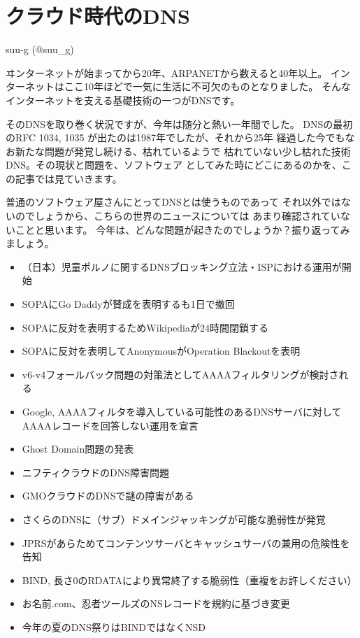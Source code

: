 
\cleardoublepage
\plainifnotempty

\chapter{クラウド時代のDNS}
\begin{flushright}
suu-g (@suu\_g)
\end{flushright}

\lettrine{ヰ}
ンターネットが始まってから20年、ARPANETから数えると40年以上。
インターネットはここ10年ほどで一気に生活に不可欠のものとなりました。
そんなインターネットを支える基礎技術の一つがDNSです。

そのDNSを取り巻く状況ですが、今年は随分と熱い一年間でした。
DNSの最初のRFC 1034, 1035 が出たのは1987年でしたが、それから25年
経過した今でもなお新たな問題が発覚し続ける、枯れているようで
枯れていない少し枯れた技術DNS。その現状と問題を、ソフトウェア
としてみた時にどこにあるのかを、この記事では見ていきます。

普通のソフトウェア屋さんにとってDNSとは使うものであって
それ以外ではないのでしょうから、こちらの世界のニュースについては
あまり確認されていないことと思います。
今年は、どんな問題が起きたのでしょうか？振り返ってみましょう。
\begin{itemize}
  \item （日本）児童ポルノに関するDNSブロッキング立法・ISPにおける運用が開始
  \item SOPAにGo Daddyが賛成を表明するも1日で撤回
  \item SOPAに反対を表明するためWikipediaが24時間閉鎖する
  \item SOPAに反対を表明してAnonymousがOperation Blackoutを表明
  \item v6-v4フォールバック問題の対策法としてAAAAフィルタリングが検討される
  \item Google, AAAAフィルタを導入している可能性のあるDNSサーバに対してAAAAレコードを回答しない運用を宣言
  \item Ghost Domain問題の発表
  \item ニフティクラウドのDNS障害問題
  \item GMOクラウドのDNSで謎の障害がある
  \item さくらのDNSに（サブ）ドメインジャッキングが可能な脆弱性が発覚
  \item JPRSがあらためてコンテンツサーバとキャッシュサーバの兼用の危険性を告知
  \item BIND, 長さ0のRDATAにより異常終了する脆弱性（重複をお許しください）
  \item お名前.com、忍者ツールズのNSレコードを規約に基づき変更
  \item 今年の夏のDNS祭りはBINDではなくNSD
\end{itemize}

